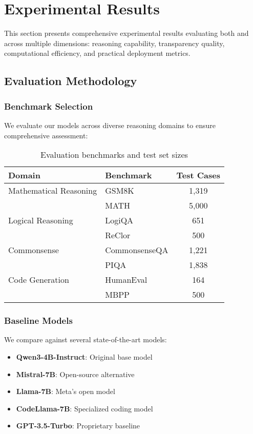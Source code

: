 \section{Experimental Results}
\label{sec:evaluation}

This section presents comprehensive experimental results evaluating both \supra{} and \zennano{} across multiple dimensions: reasoning capability, transparency quality, computational efficiency, and practical deployment metrics.

\subsection{Evaluation Methodology}

\subsubsection{Benchmark Selection}

We evaluate our models across diverse reasoning domains to ensure comprehensive assessment:

\begin{table}[H]
\centering
\begin{tabular}{llc}
\toprule
Domain & Benchmark & Test Cases \\
\midrule
Mathematical Reasoning & GSM8K & 1,319 \\
                       & MATH & 5,000 \\
Logical Reasoning & LogiQA & 651 \\
                  & ReClor & 500 \\
Commonsense & CommonsenseQA & 1,221 \\
            & PIQA & 1,838 \\
Code Generation & HumanEval & 164 \\
                & MBPP & 500 \\
\bottomrule
\end{tabular}
\caption{Evaluation benchmarks and test set sizes}
\label{tab:benchmarks}
\end{table}

\subsubsection{Baseline Models}

We compare against several state-of-the-art models:

\begin{itemize}
    \item \textbf{Qwen3-4B-Instruct}: Original base model
    \item \textbf{Mistral-7B}: Open-source alternative
    \item \textbf{Llama-7B}: Meta's open model
    \item \textbf{CodeLlama-7B}: Specialized coding model
    \item \textbf{GPT-3.5-Turbo}: Proprietary baseline
\end{itemize}


